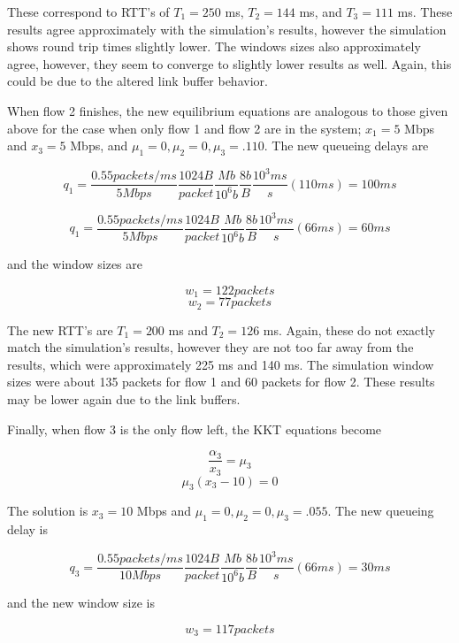 These correspond to RTT's of $T_1 = 250$ ms, $T_2 = 144$ ms, and $T_3 = 111$ ms. These results agree approximately with the simulation's results, however the simulation shows round trip times slightly lower. The windows sizes also approximately agree, however, they seem to converge to slightly lower results as well. Again, this could be due to the altered link buffer behavior.

When flow 2 finishes, the new equilibrium equations are analogous to those given above for the case when only flow 1 and flow 2 are in the system; $x_1 = 5$ Mbps and $x_3 = 5$ Mbps, and $\mu_1 = 0, \mu_2 = 0, \mu_3 = .110$. The new queueing delays are 

$$q_1 = \frac{0.55 packets/ms}{5 Mbps} \frac{1024 B}{packet} \frac{Mb}{10^6 b} \frac{8 b}{B} \frac{10^3 ms}{s} (110 ms) = 100 ms$$

$$q_1 = \frac{0.55 packets/ms}{5 Mbps} \frac{1024 B}{packet} \frac{Mb}{10^6 b} \frac{8 b}{B} \frac{10^3 ms}{s} (66 ms) = 60 ms$$

and the window sizes are

$$w_1 = 122 packets$$
$$w_2 = 77 packets$$

The new RTT's are $T_1 = 200$ ms and $T_2 = 126$ ms. Again, these do not exactly match the simulation's results, however they are not too far away from the results, which were approximately 225 ms and 140 ms. The simulation window sizes were about 135 packets for flow 1 and 60 packets for flow 2. These results may be lower again due to the link buffers.

Finally, when flow 3 is the only flow left, the KKT equations become

$$\frac{\alpha_3}{x_3}=\mu_3$$
$$\mu_3 (x_3 - 10) = 0$$

The solution is $x_3 = 10$ Mbps and $\mu_1 = 0, \mu_2 = 0, \mu_3 = .055$. The new queueing delay is 

$$q_3 = \frac{0.55 packets/ms}{10 Mbps} \frac{1024 B}{packet} \frac{Mb}{10^6 b} \frac{8 b}{B}  \frac{10^3 ms}{s} (66 ms) = 30 ms$$

and the new window size is

$$w_3 = 117 packets$$

